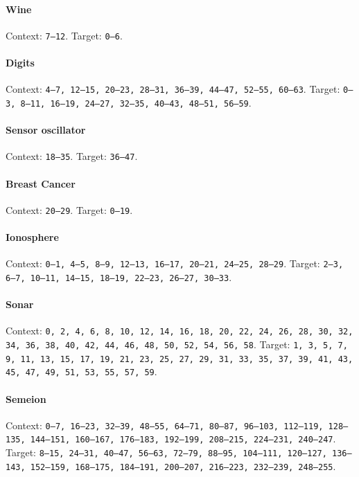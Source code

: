 \paragraph{Wine} Context: \texttt{7--12}. Target: \texttt{0--6}.

\paragraph{Digits} Context: \texttt{4--7, 12--15, 20--23, 28--31, 36--39, 44--47, 52--55, 60--63}. Target: \texttt{0--3, 8--11, 16--19, 24--27, 32--35, 40--43, 48--51, 56--59}.

\paragraph{Sensor oscillator} Context: \texttt{18--35}. Target: \texttt{36--47}.

\paragraph{Breast Cancer} Context: \texttt{20--29}. Target: \texttt{0--19}.

\paragraph{Ionosphere} Context: \texttt{0--1, 4--5, 8--9, 12--13, 16--17, 20--21, 24--25, 28--29}. Target: \texttt{2--3, 6--7, 10--11, 14--15, 18--19, 22--23, 26--27, 30--33}.

\paragraph{Sonar} Context: \texttt{0, 2, 4, 6, 8, 10, 12, 14, 16, 18, 20, 22, 24, 26, 28, 30, 32, 34, 36, 38, 40, 42, 44, 46, 48, 50, 52, 54, 56, 58}. Target: \texttt{1, 3, 5, 7, 9, 11, 13, 15, 17, 19, 21, 23, 25, 27, 29, 31, 33, 35, 37, 39, 41, 43, 45, 47, 49, 51, 53, 55, 57, 59}.

\paragraph{Semeion} Context: \texttt{0--7, 16--23, 32--39, 48--55, 64--71, 80--87, 96--103, 112--119, 128--135, 144--151, 160--167, 176--183, 192--199, 208--215, 224--231, 240--247}. Target: \texttt{8--15, 24--31, 40--47, 56--63, 72--79, 88--95, 104--111, 120--127, 136--143, 152--159, 168--175, 184--191, 200--207, 216--223, 232--239, 248--255}.

